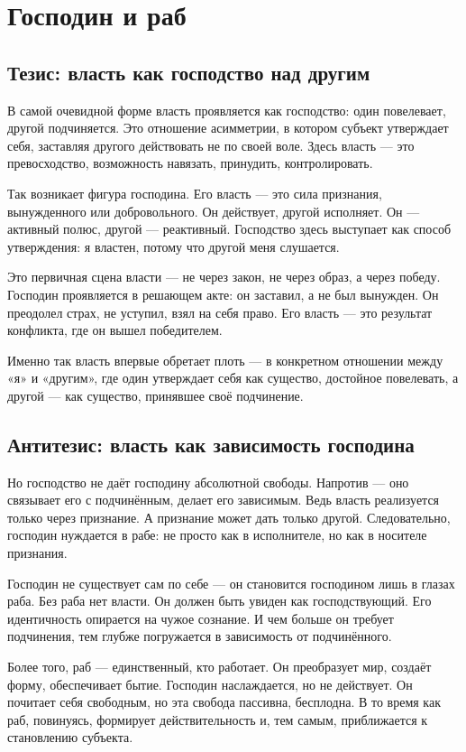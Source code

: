 \chapter{Господин и раб}

\section{Тезис: власть как господство над другим}

В самой очевидной форме власть проявляется как господство: один повелевает, другой подчиняется. Это отношение асимметрии, в котором субъект утверждает себя, заставляя другого действовать не по своей воле. Здесь власть — это превосходство, возможность навязать, принудить, контролировать.

Так возникает фигура господина. Его власть — это сила признания, вынужденного или добровольного. Он действует, другой исполняет. Он — активный полюс, другой — реактивный. Господство здесь выступает как способ утверждения: я властен, потому что другой меня слушается.

Это первичная сцена власти — не через закон, не через образ, а через победу. Господин проявляется в решающем акте: он заставил, а не был вынужден. Он преодолел страх, не уступил, взял на себя право. Его власть — это результат конфликта, где он вышел победителем.

Именно так власть впервые обретает плоть — в конкретном отношении между «я» и «другим», где один утверждает себя как существо, достойное повелевать, а другой — как существо, принявшее своё подчинение.

\section{Антитезис: власть как зависимость господина}

Но господство не даёт господину абсолютной свободы. Напротив — оно связывает его с подчинённым, делает его зависимым. Ведь власть реализуется только через признание. А признание может дать только другой. Следовательно, господин нуждается в рабе: не просто как в исполнителе, но как в носителе признания.

Господин не существует сам по себе — он становится господином лишь в глазах раба. Без раба нет власти. Он должен быть увиден как господствующий. Его идентичность опирается на чужое сознание. И чем больше он требует подчинения, тем глубже погружается в зависимость от подчинённого.

Более того, раб — единственный, кто работает. Он преобразует мир, создаёт форму, обеспечивает бытие. Господин наслаждается, но не действует. Он почитает себя свободным, но эта свобода пассивна, бесплодна. В то время как раб, повинуясь, формирует действительность и, тем самым, приближается к становлению субъекта.

